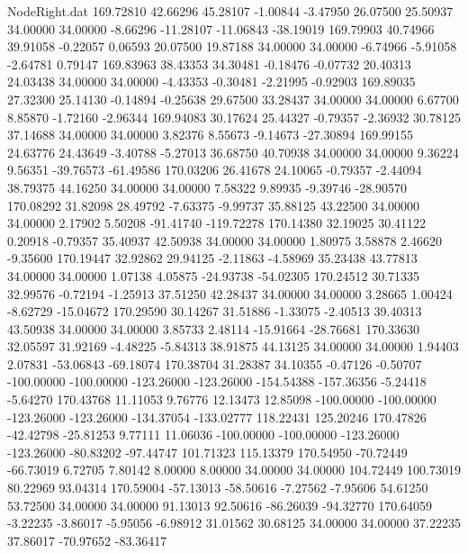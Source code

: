 \begin{filecontents}{NodeRight.dat}
 169.72810   42.66296   45.28107    -1.00844   -3.47950   26.07500   25.50937   34.00000   34.00000   -8.66296  -11.28107  -11.06843  -38.19019
 169.79903   40.74966   39.91058    -0.22057    0.06593   20.07500   19.87188   34.00000   34.00000   -6.74966   -5.91058   -2.64781    0.79147
 169.83963   38.43353   34.30481    -0.18476   -0.07732   20.40313   24.03438   34.00000   34.00000   -4.43353   -0.30481   -2.21995   -0.92903
 169.89035   27.32300   25.14130    -0.14894   -0.25638   29.67500   33.28437   34.00000   34.00000    6.67700    8.85870   -1.72160   -2.96344
 169.94083   30.17624   25.44327    -0.79357   -2.36932   30.78125   37.14688   34.00000   34.00000    3.82376    8.55673   -9.14673  -27.30894
 169.99155   24.63776   24.43649    -3.40788   -5.27013   36.68750   40.70938   34.00000   34.00000    9.36224    9.56351  -39.76573  -61.49586
 170.03206   26.41678   24.10065    -0.79357   -2.44094   38.79375   44.16250   34.00000   34.00000    7.58322    9.89935   -9.39746  -28.90570
 170.08292   31.82098   28.49792    -7.63375   -9.99737   35.88125   43.22500   34.00000   34.00000    2.17902    5.50208  -91.41740 -119.72278
 170.14380   32.19025   30.41122     0.20918   -0.79357   35.40937   42.50938   34.00000   34.00000    1.80975    3.58878    2.46620   -9.35600
 170.19447   32.92862   29.94125    -2.11863   -4.58969   35.23438   43.77813   34.00000   34.00000    1.07138    4.05875  -24.93738  -54.02305
 170.24512   30.71335   32.99576    -0.72194   -1.25913   37.51250   42.28437   34.00000   34.00000    3.28665    1.00424   -8.62729  -15.04672
 170.29590   30.14267   31.51886    -1.33075   -2.40513   39.40313   43.50938   34.00000   34.00000    3.85733    2.48114  -15.91664  -28.76681
 170.33630   32.05597   31.92169    -4.48225   -5.84313   38.91875   44.13125   34.00000   34.00000    1.94403    2.07831  -53.06843  -69.18074
 170.38704   31.28387   34.10355    -0.47126   -0.50707 -100.00000 -100.00000 -123.26000 -123.26000 -154.54388 -157.36356   -5.24418   -5.64270
 170.43768   11.11053    9.76776    12.13473   12.85098 -100.00000 -100.00000 -123.26000 -123.26000 -134.37054 -133.02777  118.22431  125.20246
 170.47826  -42.42798  -25.81253     9.77111   11.06036 -100.00000 -100.00000 -123.26000 -123.26000  -80.83202  -97.44747  101.71323  115.13379
 170.54950  -70.72449  -66.73019     6.72705    7.80142    8.00000    8.00000   34.00000   34.00000  104.72449  100.73019   80.22969   93.04314
 170.59004  -57.13013  -58.50616    -7.27562   -7.95606   54.61250   53.72500   34.00000   34.00000   91.13013   92.50616  -86.26039  -94.32770
 170.64059   -3.22235   -3.86017    -5.95056   -6.98912   31.01562   30.68125   34.00000   34.00000   37.22235   37.86017  -70.97652  -83.36417

\end{filecontents}
